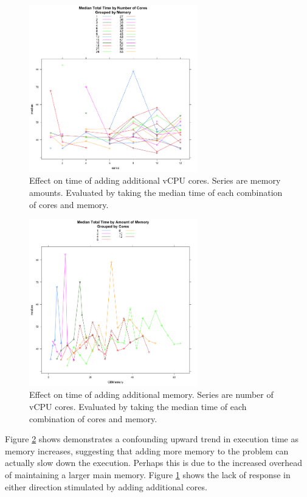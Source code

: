 \documentclass[a4paper]{article}
\begin{document}
\begin{figure}
\centering
\includegraphics[width=0.65\textwidth]{Cores_and_memory.png}
\caption{Effect on time of adding additional vCPU cores.  Series are memory amounts. Evaluated by taking the median time of each combination of cores and memory.}\label{fig:cores_vs_memory}
\end{figure}

\begin{figure}
\centering
\includegraphics[width=0.65\textwidth]{Cores_by_memory.png}
\caption{Effect on time of adding additional memory.  Series are number of vCPU cores. Evaluated by taking the median time of each combination of cores and memory.}\label{fig:memory_vs_cores}
\end{figure}

Figure \ref{fig:memory_vs_cores} shows demonstrates a confounding upward trend in execution time as memory increases, suggesting that adding more memory to the problem can actually slow down the execution.  Perhaps this is due to the increased overhead of maintaining a larger main memory.  Figure \ref{fig:cores_vs_memory} shows the lack of response in either direction stimulated by adding additional cores.
\end{document}
